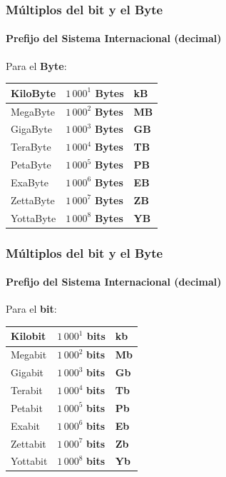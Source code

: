 \documentclass[11pt,a4paper,spanish]{beamer}
\begin{document}
\begin{frame}

\frametitle{Múltiplos del \textbf{bit} y el \textbf{Byte}}

\framesubtitle{Prefijo del Sistema Internacional (decimal)}

    Para el \textbf{Byte}:

\centering
\begin{tabular}{l l l}
    KiloByte & $1\,000^{1}$ \textbf{Bytes} & \textbf{kB}\\ \hline
    MegaByte & $1\,000^{2}$ \textbf{Bytes} & \textbf{MB}\\ \hline
    GigaByte & $1\,000^{3}$ \textbf{Bytes} & \textbf{GB}\\ \hline
    TeraByte & $1\,000^{4}$ \textbf{Bytes} & \textbf{TB}\\ \hline
    PetaByte & $1\,000^{5}$ \textbf{Bytes} & \textbf{PB}\\ \hline
    ExaByte & $1\,000^{6}$ \textbf{Bytes} & \textbf{EB}\\ \hline
    ZettaByte & $1\,000^{7}$ \textbf{Bytes} & \textbf{ZB}\\ \hline
    YottaByte & $1\,000^{8}$ \textbf{Bytes} & \textbf{YB}\\
\end{tabular}

\end{frame}

\begin{frame}

\frametitle{Múltiplos del \textbf{bit} y el \textbf{Byte}}

\framesubtitle{Prefijo del Sistema Internacional (decimal)}

    Para el \textbf{bit}:

\centering
\begin{tabular}{l l l}
    Kilobit & $1\,000^{1}$ \textbf{bits} & \textbf{kb}\\ \hline
    Megabit & $1\,000^{2}$ \textbf{bits} & \textbf{Mb}\\ \hline
    Gigabit & $1\,000^{3}$ \textbf{bits} & \textbf{Gb}\\ \hline
    Terabit & $1\,000^{4}$ \textbf{bits} & \textbf{Tb}\\ \hline
    Petabit & $1\,000^{5}$ \textbf{bits} & \textbf{Pb}\\ \hline
    Exabit & $1\,000^{6}$ \textbf{bits} & \textbf{Eb}\\ \hline
    Zettabit & $1\,000^{7}$ \textbf{bits} & \textbf{Zb}\\ \hline
    Yottabit & $1\,000^{8}$ \textbf{bits} & \textbf{Yb}\\
\end{tabular}
\end{frame}
\end{document}
